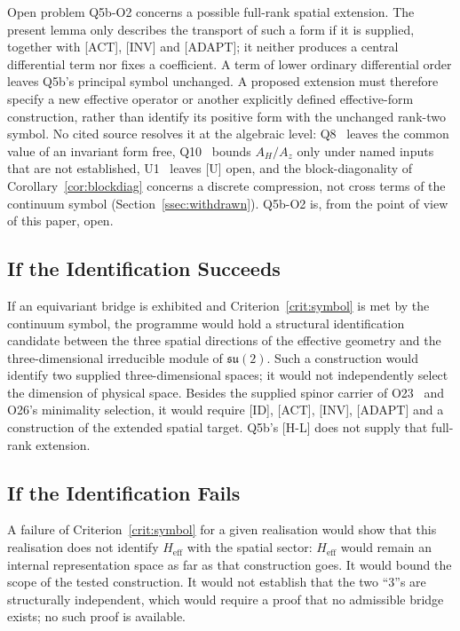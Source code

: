 \documentclass[11pt,a4paper]{article}
\newcommand{\Heff}{H_{\mathrm{eff}}}
\newcommand{\su}{\mathfrak{su}}
\begin{document}
    Open problem Q5b-O2 concerns a possible full-rank spatial extension.
    The present lemma only describes the transport of such a form if it is supplied, together
    with [ACT], [INV] and [ADAPT]; it neither produces a central differential term nor fixes a
    coefficient.
    A term of lower ordinary differential order leaves Q5b's principal symbol unchanged.
    A proposed extension must therefore specify a new effective operator or another explicitly
    defined effective-form construction, rather than identify its positive form with the
    unchanged rank-two symbol.
    No cited source resolves it at the algebraic level: Q8~\cite{BeauQ8} leaves the common value
    of an invariant form free, Q10~\cite{Beau2026q10} bounds $A_H/A_z$ only under named inputs that
    are not established, U1~\cite{Beau2026u1} leaves [U] open, and the block-diagonality of
    Corollary~\ref{cor:blockdiag} concerns a discrete compression, not cross terms of the continuum
    symbol (Section~\ref{ssec:withdrawn}).
    Q5b-O2 is, from the point of view of this paper, open.

  \subsection{If the Identification Succeeds}

    If an equivariant bridge is exhibited and Criterion~\ref{crit:symbol} is met by the
    continuum symbol, the programme would hold a structural identification candidate between the
    three spatial directions of the effective geometry and the three-dimensional irreducible
    module of $\su(2)$.
    Such a construction would identify two supplied three-dimensional spaces; it would not
    independently select the dimension of physical space.
    Besides the supplied spinor carrier of O23~\cite{Beau2026a27} and O26's minimality selection,
    it would require [ID], [ACT], [INV], [ADAPT] and a construction of the extended spatial target.
    Q5b's [H-L] does not supply that full-rank extension.

  \subsection{If the Identification Fails}

    A failure of Criterion~\ref{crit:symbol} for a given realisation would show that this
    realisation does not identify $\Heff$ with the spatial sector: $\Heff$ would remain an internal
    representation space as far as that construction goes.
    It would bound the scope of the tested construction.
    It would not establish that the two ``3''s are structurally independent, which would require a
    proof that no admissible bridge exists; no such proof is available.
\end{document}
